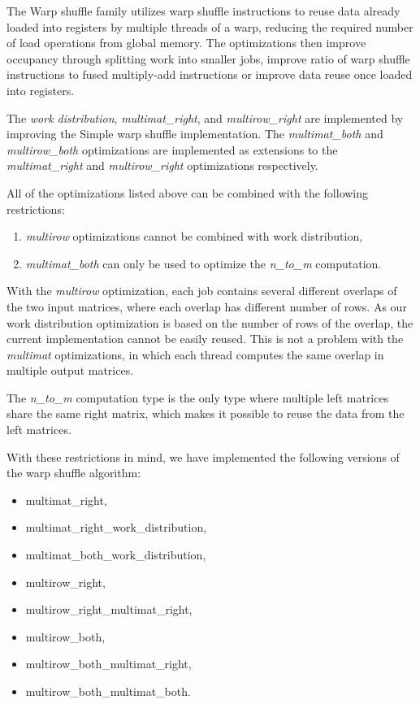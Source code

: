 The Warp shuffle family utilizes warp shuffle instructions to reuse data already loaded into registers by multiple threads of a warp, reducing the required number of load operations from global memory. The optimizations then improve occupancy through splitting work into smaller jobs, improve ratio of warp shuffle instructions to fused multiply-add instructions or improve data reuse once loaded into registers.


The \textit{work distribution}, \textit{multimat\_right}, and \textit{multirow\_right} are implemented by improving the Simple warp shuffle implementation. The  \textit{multimat\_both} and \textit{multirow\_both} optimizations are implemented as extensions to the \textit{multimat\_right} and \textit{multirow\_right} optimizations respectively.


All of the optimizations listed above can be combined with the following restrictions:
\begin{enumerate}
	\item \textit{multirow} optimizations cannot be combined with work distribution,
	\item \textit{multimat\_both} can only be used to optimize the \textit{n\_to\_m} computation. 
\end{enumerate}

With the \textit{multirow} optimization, each job contains several different overlaps of the two input matrices, where each overlap has different number of rows. As our work distribution optimization is based on the number of rows of the overlap, the current implementation cannot be easily reused. This is not a problem with the \textit{multimat} optimizations, in which each thread computes the same overlap in multiple output matrices.

The \textit{n\_to\_m} computation type is the only type where multiple left matrices share the same right matrix, which makes it possible to reuse the data from the left matrices.


With these restrictions in mind, we have implemented the following versions of the warp shuffle algorithm:

\begin{itemize}
	\item multimat\_right,
	\item multimat\_right\_work\_distribution,
	\item multimat\_both\_work\_distribution,
	\item multirow\_right,
	\item multirow\_right\_multimat\_right,
	\item multirow\_both,
	\item multirow\_both\_multimat\_right,
	\item multirow\_both\_multimat\_both.
\end{itemize}


